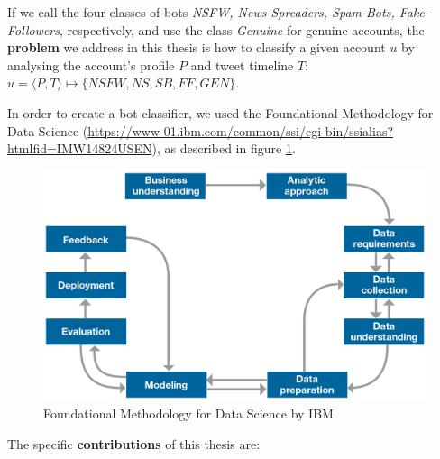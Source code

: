 If we call the four classes of bots \emph{NSFW, News-Spreaders, Spam-Bots, Fake-Followers}, respectively, 
and use the class \emph{Genuine} for genuine accounts, the \textbf{problem} we address in this thesis is how to classify a given account $u$ by analysing the account's profile $P$ and tweet timeline $T$:  
$u = \langle P, T \rangle \mapsto \{NSFW, NS, SB, FF, GEN\}$.

In order to create a bot classifier, we used the Foundational Methodology for Data Science (\url{https://www-01.ibm.com/common/ssi/cgi-bin/ssialias?htmlfid=IMW14824USEN}), as described in figure \ref{fig:methodology}.

\begin{figure}
	\includegraphics[width=\linewidth]{chapter1/figure/methodology.jpg}
	\caption{Foundational Methodology for Data Science by IBM}
	\label{fig:methodology}
\end{figure}

The specific \textbf{contributions} of this thesis are:

